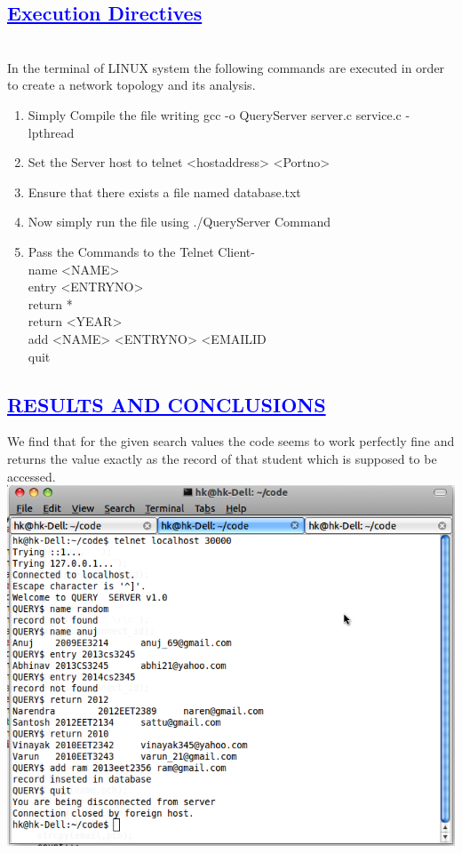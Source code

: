 \documentclass[a4paper,12pt]{report}
\begin{document}
\begin{center}
\chapter{\textcolor{blue}{\underline {Execution Directives}}}
\end{center}
\noindent \\ In the terminal of LINUX system the following commands are executed in order to create a network topology and its analysis.\\
\begin{enumerate}
  \item Simply Compile the file writing gcc -o QueryServer server.c service.c -lpthread
  \item Set the Server host to telnet <hostaddress> <Portno>
  \item Ensure that there exists a file named database.txt
  \item Now simply run the file using ./QueryServer Command
  \item Pass the Commands to the Telnet Client-
\\name <NAME> 
\\entry <ENTRYNO>
\\return *
\\return <YEAR>
\\add <NAME> <ENTRYNO> <EMAILID
\\quit
\end{enumerate}



\begin{center}
\chapter{\textcolor{blue}{\underline {RESULTS AND CONCLUSIONS}}}
\noindent We find that for the given search values the code seems to work perfectly fine and returns the value exactly as the 
	  record of that student which is supposed to be accessed.
 \includegraphics[width=12 cm,height=12 cm]{./Screenshot.png}
\end{center}
\end{document}
